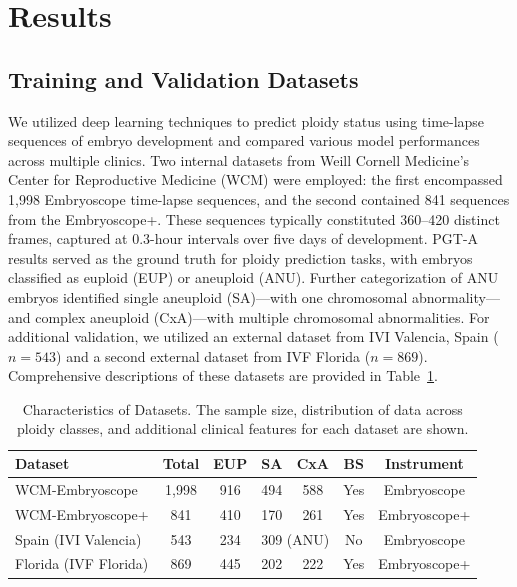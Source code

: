 \documentclass[12pt]{article}
\begin{document}
\section{Results}

\subsection{Training and Validation Datasets}

We utilized deep learning techniques to predict ploidy status using time-lapse sequences of embryo development and compared various model performances across multiple clinics. Two internal datasets from Weill Cornell Medicine's Center for Reproductive Medicine (WCM) were employed: the first encompassed 1,998 Embryoscope time-lapse sequences, and the second contained 841 sequences from the Embryoscope+. These sequences typically constituted 360--420 distinct frames, captured at 0.3-hour intervals over five days of development. PGT-A results served as the ground truth for ploidy prediction tasks, with embryos classified as euploid (EUP) or aneuploid (ANU). Further categorization of ANU embryos identified single aneuploid (SA)---with one chromosomal abnormality---and complex aneuploid (CxA)---with multiple chromosomal abnormalities. For additional validation, we utilized an external dataset from IVI Valencia, Spain ($n=543$) and a second external dataset from IVF Florida ($n=869$). Comprehensive descriptions of these datasets are provided in Table~\ref{tab:datasets}.

\begin{table}[H]
\centering
\caption{Characteristics of Datasets. The sample size, distribution of data across ploidy classes, and additional clinical features for each dataset are shown.}
\label{tab:datasets}
\begin{tabular}{lcccccc}
\toprule
\textbf{Dataset} & \textbf{Total} & \textbf{EUP} & \textbf{SA} & \textbf{CxA} & \textbf{BS} & \textbf{Instrument} \\
\midrule
WCM-Embryoscope & 1,998 & 916 & 494 & 588 & Yes & Embryoscope \\
WCM-Embryoscope+ & 841 & 410 & 170 & 261 & Yes & Embryoscope+ \\
Spain (IVI Valencia) & 543 & 234 & \multicolumn{2}{c}{309 (ANU)} & No & Embryoscope \\
Florida (IVF Florida) & 869 & 445 & 202 & 222 & Yes & Embryoscope+ \\
\bottomrule
\end{tabular}
\end{table}
\end{document}
